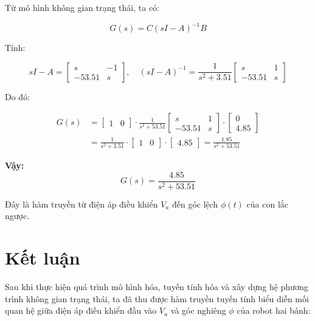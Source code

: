         Từ mô hình không gian trạng thái, ta có:
        
        \[
        G(s) = C(sI - A)^{-1}B
        \]
        
        Tính:
        
        \[
        sI - A =
        \begin{bmatrix}
            s & -1 \\
            -53.51 & s
        \end{bmatrix}, \quad
            (sI - A)^{-1} = \frac{1}{s^2 + 3.51}
        \begin{bmatrix}
            s & 1 \\
            -53.51 & s
        \end{bmatrix}
        \]
        
        Do đó:
        
        \begin{align*}
            G(s) &= \begin{bmatrix} 1 & 0 \end{bmatrix}
            \cdot \frac{1}{s^2 + 53.51}
        \begin{bmatrix}
            s & 1 \\
            -53.51 & s
        \end{bmatrix}
        \cdot
        \begin{bmatrix}
            0 \\
            4.85
        \end{bmatrix} \\
        &= \frac{1}{s^2 + 3.51} \cdot \begin{bmatrix} 1 & 0 \end{bmatrix}
        \cdot
        \begin{bmatrix}
            4.85
        \end{bmatrix}
        = \frac{1.85}{s^2 + 53.51}
        \end{align*}
        
        \textbf{Vậy:}
        \[
            G(s) = \frac{4.85}{s^2 + 53.51}
        \]
        
        Đây là hàm truyền từ điện áp điều khiển \( V_a \) đến góc lệch \( \phi(t) \) của con lắc ngược.
    \section{Kết luận}
        \hspace*{0.6cm}Sau khi thực hiện quá trình mô hình hóa, tuyến tính hóa và xây dựng hệ phương trình không gian trạng thái, ta đã thu được hàm truyền tuyến tính biểu diễn mối quan hệ giữa điện áp điều khiển đầu vào $V_a$ và góc nghiêng $\phi$ của robot hai bánh:

